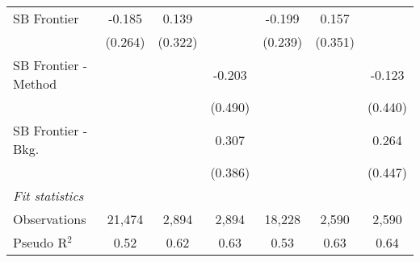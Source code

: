 \begin{tabular}{lcccccc}
   SB Frontier          & -0.185        & 0.139   &              & -0.199        & 0.157   &   \\   
                        & (0.264)       & (0.322) &              & (0.239)       & (0.351) &   \\   
   SB Frontier - Method &               &         & -0.203       &               &         & -0.123\\   
                        &               &         & (0.490)      &               &         & (0.440)\\   
   SB Frontier - Bkg.   &               &         & 0.307        &               &         & 0.264\\   
                        &               &         & (0.386)      &               &         & (0.447)\\   
   \midrule
   \emph{Fit statistics}\\
   Observations         & 21,474        & 2,894   & 2,894        & 18,228        & 2,590   & 2,590\\  
   Pseudo R$^2$         & 0.52          & 0.62    & 0.63         & 0.53          & 0.63    & 0.64\\  
   

\end{tabular}
